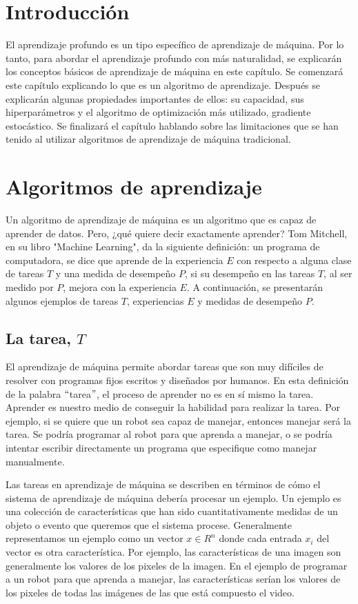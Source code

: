 \section{Introducción}
El aprendizaje profundo es un tipo específico de aprendizaje de máquina. Por lo tanto, para abordar el aprendizaje profundo con más naturalidad, se explicarán los conceptos básicos de aprendizaje de máquina en este capítulo. Se comenzará este capítulo explicando lo que es un algoritmo de aprendizaje. Después se explicarán algunas propiedades importantes de ellos: su capacidad, sus hiperparámetros y el algoritmo de optimización más utilizado, gradiente estocástico. Se finalizará el capítulo hablando sobre las limitaciones que se han tenido al utilizar algoritmos de aprendizaje de máquina tradicional.

\section{Algoritmos de aprendizaje}
Un algoritmo de aprendizaje de máquina es un algoritmo que es capaz de aprender de datos. Pero, ¿qué quiere decir exactamente aprender? Tom Mitchell, en su libro "Machine Learning", da la siguiente definición: un programa de computadora, se dice que aprende de la experiencia $E$ con respecto a alguna clase de tareas $T$ y una medida de desempeño $P$, si su desempeño en las tareas $T$, al ser medido por $P$, mejora con la experiencia $E$. A continuación, se presentarán algunos ejemplos de tareas $T$, experiencias $E$ y medidas de desempeño $P$. \cite{Mitchell:1997:ML:541177}

\subsection{La tarea, $T$}
El aprendizaje de máquina permite abordar tareas que son muy difíciles de resolver con programas fijos escritos y diseñados por humanos.
En esta definición de la palabra $``$tarea$"$, el proceso de aprender no es en sí mismo la tarea. Aprender es nuestro medio de conseguir la habilidad para realizar la tarea. Por ejemplo, si se quiere que un robot sea capaz de manejar, entonces manejar será la tarea. Se podría programar al robot para que aprenda a manejar, o se podría intentar escribir directamente un programa que especifique como manejar manualmente. \cite{goodfellow-et-al-2016} \cite{Mitchell:1997:ML:541177}

\vspace{1em}

Las tareas en aprendizaje de máquina se describen en términos de cómo el sistema de aprendizaje de máquina debería procesar un ejemplo. Un ejemplo es una colección de características que han sido cuantitativamente medidas de un objeto o evento que queremos que el sistema procese. Generalmente representamos un ejemplo como un vector $x \in R^n$ donde cada entrada $x_i$ del vector es otra característica. Por ejemplo, las características de una imagen son generalmente los valores de los pixeles de la imagen. En el ejemplo de programar a un robot para que aprenda a manejar, las características serían los valores de los pixeles de todas las imágenes de las que está compuesto el video. \cite{goodfellow-et-al-2016}

